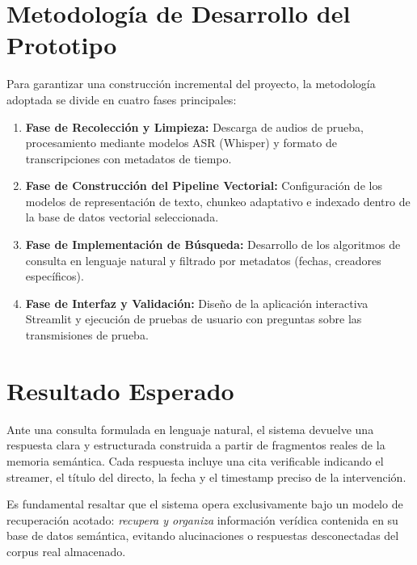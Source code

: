 \documentclass[12pt,a4paper]{article}
\begin{document}
\section{Metodología de Desarrollo del Prototipo}
Para garantizar una construcción incremental del proyecto, la metodología adoptada se divide en cuatro fases principales:
\begin{enumerate}
  \item \textbf{Fase de Recolección y Limpieza:} Descarga de audios de prueba, procesamiento mediante modelos ASR (Whisper) y formato de transcripciones con metadatos de tiempo.
  \item \textbf{Fase de Construcción del Pipeline Vectorial:} Configuración de los modelos de representación de texto, chunkeo adaptativo e indexado dentro de la base de datos vectorial seleccionada.
  \item \textbf{Fase de Implementación de Búsqueda:} Desarrollo de los algoritmos de consulta en lenguaje natural y filtrado por metadatos (fechas, creadores específicos).
  \item \textbf{Fase de Interfaz y Validación:} Diseño de la aplicación interactiva Streamlit y ejecución de pruebas de usuario con preguntas sobre las transmisiones de prueba.
\end{enumerate}


\section{Resultado Esperado}
Ante una consulta formulada en lenguaje natural, el sistema devuelve una respuesta clara y estructurada construida a partir de fragmentos reales de la memoria semántica. Cada respuesta incluye una cita verificable indicando el streamer, el título del directo, la fecha y el timestamp preciso de la intervención. 

Es fundamental resaltar que el sistema opera exclusivamente bajo un modelo de recuperación acotado: \emph{recupera y organiza} información verídica contenida en su base de datos semántica, evitando alucinaciones o respuestas desconectadas del corpus real almacenado.
\end{document}
